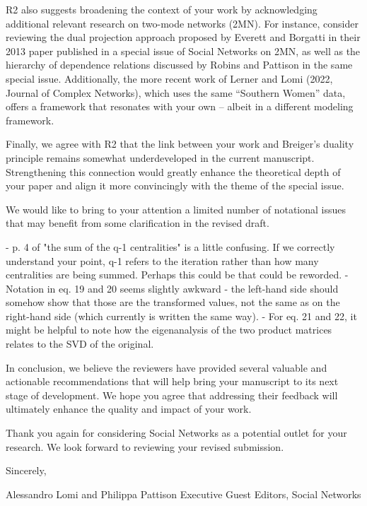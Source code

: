 \documentclass[]{letter}
\begin{document}
R2 also suggests broadening the context of your work by acknowledging additional relevant research on two-mode networks (2MN). For instance, consider reviewing the dual projection approach proposed by Everett and Borgatti in their 2013 paper published in a special issue of Social Networks on 2MN, as well as the hierarchy of dependence relations discussed by Robins and Pattison in the same special issue. Additionally, the more recent work of Lerner and Lomi (2022, Journal of Complex Networks), which uses the same “Southern Women” data, offers a framework that resonates with your own – albeit in a different modeling framework.

Finally, we agree with R2 that the link between your work and Breiger’s duality principle remains somewhat underdeveloped in the current manuscript. Strengthening this connection would greatly enhance the theoretical depth of your paper and align it more convincingly with the theme of the special issue.

We would like to bring to your attention a limited number of notational issues that may benefit from some clarification in the revised draft.

- p. 4 of "the sum of the q-1 centralities" is a little confusing. If we correctly understand your point, q-1 refers to the iteration rather than how many centralities are being summed. Perhaps this could be that could be reworded.
- Notation in eq. 19 and 20 seems slightly awkward - the left-hand side should somehow show that those are the transformed values, not the same as on the right-hand side (which currently is written the same way).
- For eq. 21 and 22, it might be helpful to note how the eigenanalysis of the two product matrices relates to the SVD of the original.

In conclusion, we believe the reviewers have provided several valuable and actionable recommendations that will help bring your manuscript to its next stage of development. We hope you agree that addressing their feedback will ultimately enhance the quality and impact of your work.

Thank you again for considering Social Networks as a potential outlet for your research. We look forward to reviewing your revised submission.

Sincerely,

Alessandro Lomi and Philippa Pattison
Executive Guest Editors, Social Networks
\end{document}
